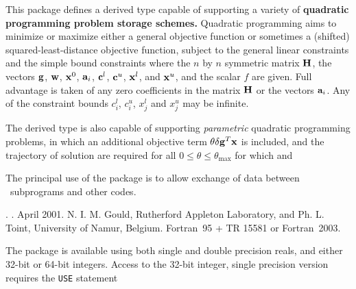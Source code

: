 \documentclass{galahad}
\newcommand{\packagename}{QPT}
\newcommand{\fullpackagename}{\libraryname\_\packagename}
\begin{document}
\galheader


\galsummary
This package defines a derived type capable of supporting
a variety of {\bf quadratic programming problem storage schemes.}
Quadratic programming aims to minimize or maximize either
a general objective function
or sometimes a (shifted) squared-least-distance objective function,
subject to the general linear constraints
and the simple bound constraints
where the $n$ by $n$ symmetric matrix ${\mathbf{H}}$,
the vectors ${\mathbf{g}}$, ${\mathbf{w}}$, ${\mathbf{x}}^{0}$,
${\mathbf{a}}_{i}$, ${\mathbf{c}}^{l}$, ${\mathbf{c}}^{u}$, ${\mathbf{x}}^{l}$,
and ${\mathbf{x}}^{u}$, and the scalar $f$ are given.
Full advantage is taken of any zero coefficients in the matrix ${\mathbf{H}}$ or the
vectors ${\mathbf{a}}_{i}$.
Any of the constraint bounds $c_{i}^{l}$, $c_{i}^{u}$,
$x_{j}^{l}$ and $x_{j}^{u}$ may be infinite.

The derived type is also capable of supporting {\em parametric}
quadratic programming problems, in which an additional objective
term $\theta \delta {\mathbf{g}}^T {\mathbf{x}}$ is included, and the trajectory of
solution are required for all $0 \leq \theta \leq \theta_{\max}$
for which
and

The principal use of the package is to allow exchange of data between
\galahad\ subprograms and other codes.


\galattributes
\galversions{\tt  \fullpackagename\_single, \fullpackagename\_double}.
.
\galdate April 2001.
\galorigin N. I. M. Gould, Rutherford Appleton Laboratory, and
Ph. L. Toint, University of Namur, Belgium.
\gallanguage Fortran~95 + TR 15581 or Fortran~2003.


\galhowto

The package is available using both single and double precision reals, 
and either 32-bit or 64-bit integers. Access to the 32-bit integer,
single precision version requires the {\tt USE} statement
\medskip
\end{document}
